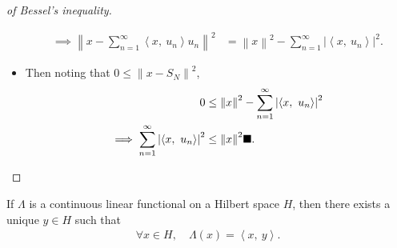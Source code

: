 \begin{proof}[of Bessel's inequality]
\begin{itemize}
\begin{align*}
  \implies 
  {\left\lVert {x - \sum_{n=1}^\infty {\left\langle {x},~{u_{n}} \right\rangle} u_{n}} \right\rVert}^2 &= {\left\lVert {x} \right\rVert}^2 - 
  \sum_{n=1}^\infty {\left\lvert {{\left\langle {x},~{u_{n}} \right\rangle}} \right\rvert}^2
  .\end{align*}
\item
  Then noting that \(0 \leq {\left\lVert {x - S_{N}} \right\rVert}^2\),
  \begin{align*}
  0 &\leq 
  {\left\lVert {x} \right\rVert}^2 - 
  \sum_{n=1}^\infty {\left\lvert {{\left\langle {x},~{u_{n}} \right\rangle}} \right\rvert}^2 \\
  \implies 
  \sum_{n=1}^\infty {\left\lvert {{\left\langle {x},~{u_{n}} \right\rangle}} \right\rvert}^2 &\leq 
  {\left\lVert {x} \right\rVert}^2 \hfill\blacksquare
  .\end{align*}
\end{itemize}

\end{proof}

\begin{theorem}

If \(\Lambda\) is a continuous linear functional on a Hilbert space
\(H\), then there exists a unique \(y \in H\) such that
\begin{align*}
\forall x\in H,\quad \Lambda(x) = {\left\langle {x},~{y} \right\rangle}
.\end{align*}

\end{theorem}

